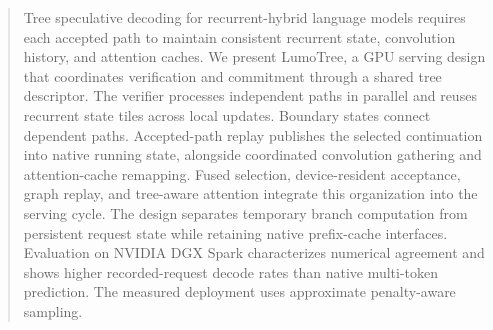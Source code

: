 \begin{abstract}
Tree speculative decoding for recurrent-hybrid language models requires each accepted path to maintain consistent recurrent state, convolution history, and attention caches. We present LumoTree, a GPU serving design that coordinates verification and commitment through a shared tree descriptor. The verifier processes independent paths in parallel and reuses recurrent state tiles across local updates. Boundary states connect dependent paths. Accepted-path replay publishes the selected continuation into native running state, alongside coordinated convolution gathering and attention-cache remapping. Fused selection, device-resident acceptance, graph replay, and tree-aware attention integrate this organization into the serving cycle. The design separates temporary branch computation from persistent request state while retaining native prefix-cache interfaces. Evaluation on NVIDIA DGX Spark characterizes numerical agreement and shows higher recorded-request decode rates than native multi-token prediction. The measured deployment uses approximate penalty-aware sampling.
\end{abstract}
